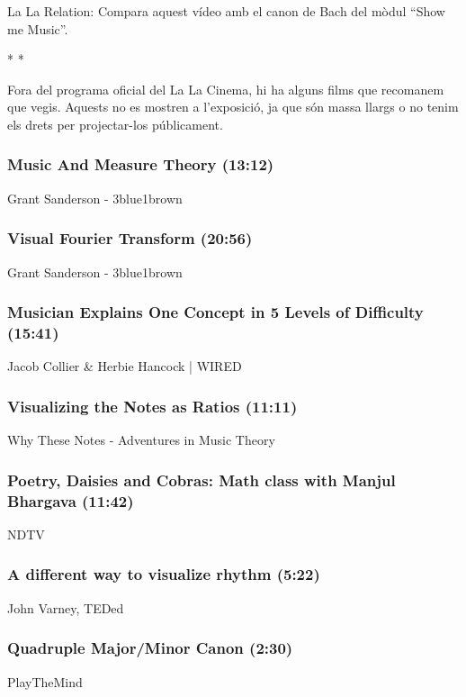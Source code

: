 La La Relation: Compara aquest vídeo amb el canon de Bach del mòdul ``Show me Music''.

\begin{center} \large * * * \end{center}
\vspace{1em}

Fora del programa oficial del La La Cinema, hi ha alguns films que recomanem que vegis. Aquests no es mostren a l'exposició, ja que són massa llargs o no tenim els drets per projectar-los públicament.

\subsubsection*{Music And Measure Theory (13:12)}
Grant Sanderson - 3blue1brown

\subsubsection*{Visual Fourier Transform (20:56)}
Grant Sanderson - 3blue1brown

\subsubsection*{Musician Explains One Concept in 5 Levels of Difficulty (15:41)}
Jacob Collier \& Herbie Hancock | WIRED

\subsubsection*{Visualizing the Notes as Ratios (11:11)}
Why These Notes - Adventures in Music Theory

\subsubsection*{Poetry, Daisies and Cobras: Math class with Manjul Bhargava (11:42)}
NDTV

\subsubsection*{A different way to visualize rhythm (5:22)}
John Varney, TEDed

\subsubsection*{Quadruple Major/Minor Canon (2:30)}
PlayTheMind

